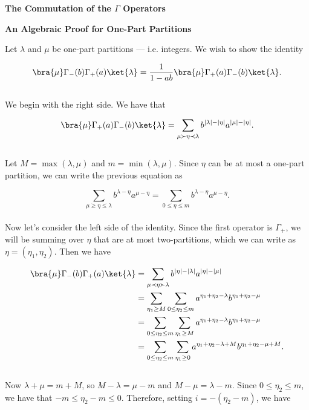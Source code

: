 



\vspace*{.25in}

\begin{center}
	\huge \textbf{The Commutation of the $\Gamma$ Operators}\\
\end{center}

\vspace{.5in}

\Large \textbf{An Algebraic Proof for One-Part Partitions}

\vspace{.25in}

\normalsize

Let $\lambda$ and $\mu$ be one-part partitions --- i.e. integers. We wish to show the identity

$$
	\bra{\mu} \Gamma_-(b) \Gamma_+(a) \ket{\lambda} = \frac{1}{1 - ab} \bra{\mu} \Gamma_+(a) \Gamma_-(b) \ket{\lambda}.
$$
~\\
We begin with the right side. We have that

$$
	\bra{\mu} \Gamma_+(a) \Gamma_-(b) \ket{\lambda} = \sum_{\mu \succ \eta \prec \lambda} b^{|\lambda| - |\eta|} a^{|\mu| - |\eta|}.
$$
~\\
Let $M = \max(\lambda, \mu)$ and $m = \min(\lambda, \mu)$. Since $\eta$ can be at most a one-part partition, we can write the previous equation as

$$
	\sum_{\mu \geq \eta \leq \lambda} b^{\lambda - \eta} a^{\mu - \eta} = \sum_{0 \leq \eta \leq m} b^{\lambda - \eta} a^{\mu - \eta}.
$$
~\\
Now let's consider the left side of the identity. Since the first operator is $\Gamma_+$, we will be summing over $\eta$ that are at most two-partitions, which we can write as $\eta = (\eta_1, \eta_2)$. Then we have

\begin{align*}
	\bra{\mu} \Gamma_-(b) \Gamma_+(a) \ket{\lambda} &= \sum_{\mu \prec \eta \succ \lambda} b^{|\eta| - |\lambda|} a^{|\eta| - |\mu|}\\
	&= \sum_{\eta_1 \geq M} \sum_{0 \leq \eta_2 \leq m} a^{\eta_1 + \eta_2 - \lambda} b^{\eta_1 + \eta_2 - \mu}\\
	&= \sum_{0 \leq \eta_2 \leq m} \sum_{\eta_1 \geq M} a^{\eta_1 + \eta_2 - \lambda} b^{\eta_1 + \eta_2 - \mu}\\
	&= \sum_{0 \leq \eta_2 \leq m} \sum_{\eta_1 \geq 0} a^{\eta_1 + \eta_2 - \lambda + M} b^{\eta_1 + \eta_2 - \mu + M}.
\end{align*}
~\\
Now $\lambda + \mu = m + M$, so $M - \lambda = \mu - m$ and $M - \mu = \lambda - m$. Since $0 \leq \eta_2 \leq m$, we have that $-m \leq \eta_2 - m \leq 0$. Therefore, setting $i = -(\eta_2 - m)$, we have

